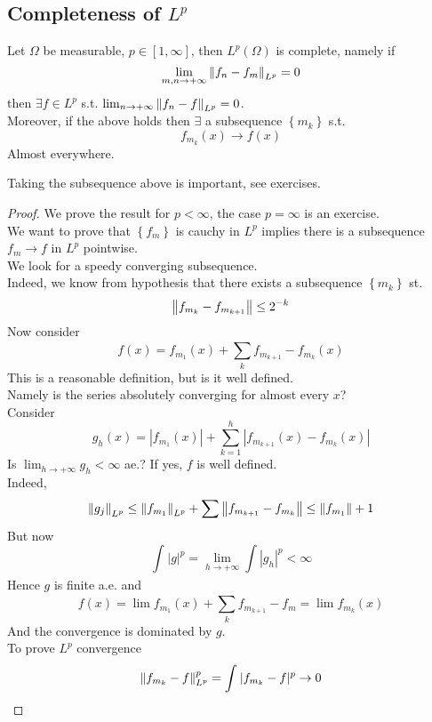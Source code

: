 \documentclass[../main.tex]{subfiles}
\begin{document}
\subsection{Completeness of $L^p$ }
\begin{thm}
	Let $\Omega$ be measurable, $p \in [ 1, \infty ] $, then $L^{p}( \Omega) $ is complete, namely if
	\[ 
	\lim_{m,n \to  + \infty} \left\lVert f_n - f_m\right\rVert _{L^{p}} = 0
	\]
	then $\exists f \in L^p$ s.t. $ \lim_{n \to  + \infty} \left\lVert f_n-f\right\rVert _{L^{p}} =0$.\\
	Moreover, if the above holds then $\exists $ a subsequence $ \left\{ m_k \right\} $ s.t.
	\[ 
	f_{m_k} ( x) \to f( x) 
	\]
	Almost everywhere.
	
\end{thm}
\begin{rmq}
Taking the subsequence above is important, see exercises.
\end{rmq}
\begin{proof}
We prove the result for $p < \infty $, the case $p= \infty $ is an exercise.\\
We want to prove that $ \left\{ f_m \right\} $ is cauchy in $L^p$ implies there is a subsequence $f_m \to f$ in $L^p$ pointwise.\\
We look for a speedy converging subsequence.\\
Indeed, we know from hypothesis that there exists a subsequence $ \left\{ m_k \right\} $ st.
\[ 
\left\lVert f_{m_k} - f_{m_{k+1} } \right\rVert \leq  2^{-k}
\]
Now consider
\[ 
f( x) = f_{m_1} ( x) + \sum_{k}^{ } f_{m_{k+1} } - f_{m_k} ( x) 
\]
This is a reasonable definition, but is it well defined.\\
Namely is the series absolutely converging for almost every $x$?\\
Consider
\[ 
g_h( x) = |f_{m_1} ( x) | + \sum_{k=1}^{ h} |f_{m_{k+1} } ( x) -f_{m_k} ( x) |
\]
Is $\lim_{h \to  + \infty} g_h< \infty $ ae.? If yes, $f$ is well defined.\\
Indeed, 
\[ 
\left\lVert g_j\right\rVert _{L^{p}} \leq \left\lVert f_{m_1} \right\rVert _{L^{p}} + \sum \left\lVert f_{m_{k+1} } - f_{m_k} \right\rVert \leq  \left\lVert f_{m_1} \right\rVert + 1
\]
But now
\[ 
\int_{  }^{  }|g|^{p}= \lim_{h \to  + \infty} \int |g_h|^{p} < \infty 
\]
Hence $g$ is finite a.e. and
\[ 
f( x) = \lim f_{m_1}( x)  + \sum_{k}^{ } f_{m_{k+1} } -f_m = \lim f_{m_k} ( x) 
\]
And the convergence is dominated by $g $.\\
To prove $L^{p}$ convergence
\[ 
\left\lVert f_{m_k} - f\right\rVert _{L^{p}} ^{p} = \int_{  }^{  }|f_{m_k} - f|^{p}\to 0
\]


	
\end{proof}




	

	
\end{document}
